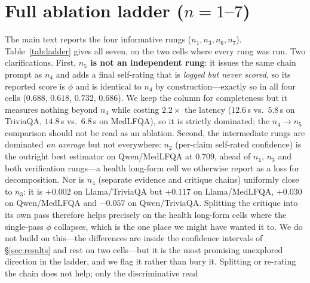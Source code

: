 \documentclass[11pt]{article}
\begin{document}




\appendix
\section{Full ablation ladder ($n{=}1$--$7$)}\label{app:ladder}
The main text reports the four informative rungs ($n_1,n_3,n_6,n_7$). Table~\ref{tab:ladder}
gives all seven, on the two cells where every rung was run. Two clarifications. First, \textbf{$n_5$ is not an independent rung}: it issues the same chain
prompt as $n_4$ and adds a final self-rating that is \emph{logged but never scored}, so its
reported score is $\phi$ and is identical to $n_4$ by construction---exactly so in all four
cells ($0.688$, $0.618$, $0.732$, $0.686$). We keep the column for completeness but it measures
nothing beyond $n_4$ while costing $2.2\times$ the latency ($12.6$\,s vs.\ $5.8$\,s on TriviaQA,
$14.8$\,s vs.\ $6.8$\,s on MedLFQA), so it is strictly dominated; the $n_4{\to}n_5$ comparison
should not be read as an ablation.
Second, the intermediate rungs are dominated \emph{on average} but not everywhere: $n_2$
(per-claim self-rated confidence) is the outright best estimator on Qwen/MedLFQA at $0.709$,
ahead of $n_1$, $n_3$ and both verification rungs---a health long-form cell we otherwise report
as a loss for decomposition. Nor is $n_4$ (separate evidence and critique chains) uniformly
close to $n_3$: it is $+0.002$ on Llama/TriviaQA but $+0.117$ on Llama/MedLFQA, $+0.030$ on
Qwen/MedLFQA and $-0.057$ on Qwen/TriviaQA. Splitting the critique into its own pass therefore
helps precisely on the health long-form cells where the single-pass $\phi$ collapses, which is
the one place we might have wanted it to. We do not build on this---the differences are inside
the confidence intervals of \S\ref{sec:results} and rest on two cells---but it is the most
promising unexplored direction in the ladder, and we flag it rather than bury it. Splitting or re-rating the chain does not help; only the discriminative read
\end{document}
